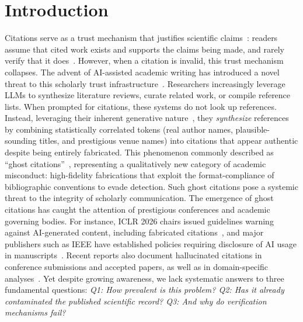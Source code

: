 \section{Introduction}

Citations serve as a trust mechanism that justifies scientific claims~\cite{kaplan1965norms,merton1973sociology}: readers assume that cited work exists and supports the claims being made, and rarely verify that it does~\cite{simkin2003read}. However, when a citation is invalid, this trust mechanism collapses.
The advent of AI-assisted academic writing has introduced a novel threat to this scholarly trust infrastructure~\cite{thorp2023chatgpt}. Researchers increasingly leverage LLMs to synthesize literature reviews, curate related work, or compile reference lists.
When prompted for citations, these systems do not look up references. Instead, leveraging their inherent generative nature~\cite{vaswani2017attention}, they \textit{synthesize} references by combining statistically correlated tokens (real author names, plausible-sounding titles, and prestigious venue names) into citations that appear authentic despite being entirely fabricated. 
This phenomenon commonly described as ``ghost citations''~\cite{zoteroforum2018ghost,consultmu2026ghost,tay2025why}, representing a qualitatively new category of academic misconduct: high-fidelity fabrications that exploit the format-compliance of bibliographic conventions to evade detection. Such ghost citations pose a systemic threat to the integrity of scholarly communication.
The emergence of ghost citations has caught the attention of prestigious conferences and academic governing bodies. For instance, ICLR 2026 chairs issued guidelines warning against AI-generated content, including fabricated citations~\cite{chairs2025iclr}, and major publishers such as IEEE have established policies requiring disclosure of AI usage in manuscripts~\cite{ieee2025ai-policy}.
Recent reports also document hallucinated citations in conference submissions and accepted papers, as well as in domain-specific analyses~\cite{gptzero2025nips,gptzero2026iclr,sakai2026hallucitation}.
Yet despite growing awareness, we lack systematic answers to three fundamental questions: 
\textit{Q1: How prevalent is this problem? Q2: Has it already contaminated the published scientific record? Q3: And why do verification mechanisms fail?}

